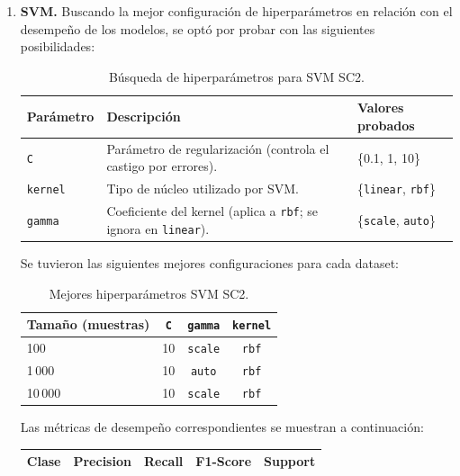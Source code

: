 \documentclass[12pt,a4paper]{article}
\begin{document}
\begin{enumerate}
  \item \textbf{SVM.}
  Buscando la mejor configuración de hiperparámetros en relación con el desempeño de los modelos, se optó por probar 
  con las siguientes posibilidades:

  \begin{table}[H]
    \centering\small
    \setlength{\tabcolsep}{4pt}
    \begin{tabularx}{\linewidth}{@{}l l X@{}}
      \toprule
      \textbf{Parámetro} & \textbf{Descripción} & \textbf{Valores probados} \\
      \midrule
      \texttt{C}      & Parámetro de regularización (controla el castigo por errores). & \{0.1, 1, 10\} \\
      \texttt{kernel} & Tipo de núcleo utilizado por SVM. & \{\texttt{linear}, \texttt{rbf}\} \\
      \texttt{gamma}  & Coeficiente del kernel (aplica a \texttt{rbf}; se ignora en \texttt{linear}). & \{\texttt{scale}, \texttt{auto}\} \\
      \bottomrule
    \end{tabularx}
    \caption{Búsqueda de hiperparámetros para SVM SC2.}
    \label{tab:param_svm_sc2}
  \end{table}

  Se tuvieron las siguientes mejores configuraciones para cada dataset:

  \begin{table}[H]
    \centering\small
    \setlength{\tabcolsep}{4pt}
    \begin{tabularx}{\linewidth}{@{}lccc@{}}
      \toprule
      \textbf{Tamaño (muestras)} & \texttt{C} & \texttt{gamma} & \texttt{kernel} \\
      \midrule
      100      & 10 & \texttt{scale} & \texttt{rbf} \\
      1\,000   & 10 & \texttt{auto}  & \texttt{rbf} \\
      10\,000  & 10 & \texttt{scale} & \texttt{rbf} \\
      \bottomrule
    \end{tabularx}
    \caption{Mejores hiperparámetros SVM SC2.}
    \label{tab:best_hparams_svm_sc2}
  \end{table}

  Las métricas de desempeño correspondientes se muestran a continuación:

  \small
  \setlength{\tabcolsep}{4pt}
  \begin{longtable}{@{}lcccc@{}}
    \toprule
    \textbf{Clase} & \textbf{Precision} & \textbf{Recall} & \textbf{F1-Score} & \textbf{Support} \\
    \midrule
    \endfirsthead


\end{longtable}
\end{enumerate}
\end{document}
